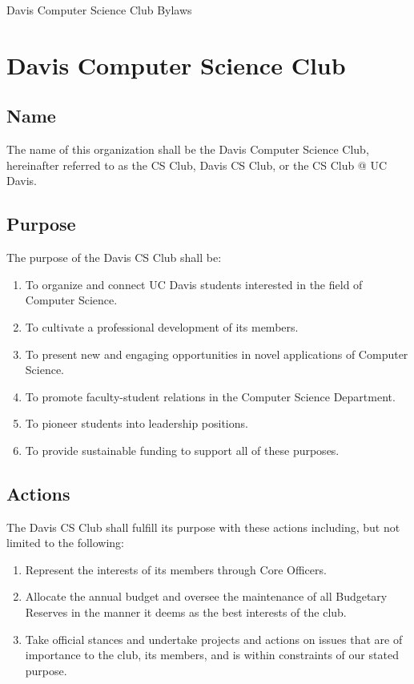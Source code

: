 \documentclass{article}
\newenvironment{li}{
\begin{enumerate}
  \setlength{\itemsep}{1pt}
  \setlength{\parskip}{0pt}
  \setlength{\parsep}{0pt}
}{\end{enumerate}}
\begin{document}

\Large{Davis Computer Science Club Bylaws}
\normalsize{}
\tableofcontents
\newpage

\singlespacing
\sectionfont{\Large}
\subsectionfont{\large}

\section{Davis Computer Science Club}
\subsection{Name}
The name of this organization shall be the Davis Computer Science Club, hereinafter referred to as the CS Club, Davis CS Club, or the CS Club @ UC Davis.

\subsection{Purpose}
The purpose of the Davis CS Club shall be:
\begin{li}
\item To organize and connect UC Davis students interested in the field of Computer Science.
\item To cultivate a professional development of its members.
\item To present new and engaging opportunities in novel applications of Computer Science.
\item To promote faculty-student relations in the Computer Science Department.
\item To pioneer students into leadership positions.
\item To provide sustainable funding to support all of these purposes.
\end{li}

\subsection{Actions}
The Davis CS Club shall fulfill its purpose with these actions including, but not limited to the following:
\begin{li}
\item Represent the interests of its members through Core Officers.
\item Allocate the annual budget and oversee the maintenance of all Budgetary Reserves in the manner it deems as the best interests of the club.
\item Take official stances and undertake projects and actions on issues that are of importance to the club, its members, and is within constraints of our stated purpose.
\end{li}
\end{document}
